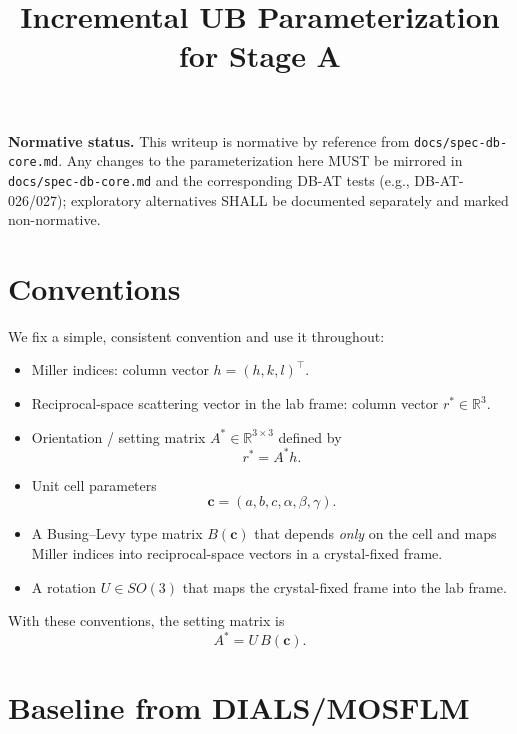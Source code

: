 \documentclass[11pt]{article}
\begin{document}
\title{Incremental UB Parameterization for Stage A}
\author{}
\date{}
\maketitle

\noindent\textbf{Normative status.} This writeup is normative by reference from \texttt{docs/spec-db-core.md}. Any changes to the parameterization here MUST be mirrored in \texttt{docs/spec-db-core.md} and the corresponding DB-AT tests (e.g., DB-AT-026/027); exploratory alternatives SHALL be documented separately and marked non-normative.

\section{Conventions}

We fix a simple, consistent convention and use it throughout:

\begin{itemize}
  \item Miller indices: column vector $h = (h,k,l)^\top$.
  \item Reciprocal-space scattering vector in the lab frame:
        column vector $r^\ast \in \mathbb{R}^3$.
  \item Orientation / setting matrix $A^\ast \in \mathbb{R}^{3\times 3}$ defined by
        \begin{equation}
          r^\ast = A^\ast h.
        \end{equation}
  \item Unit cell parameters
        \begin{equation}
          \mathbf{c} = (a, b, c, \alpha, \beta, \gamma).
        \end{equation}
  \item A Busing--Levy type matrix $B(\mathbf{c})$ that depends \emph{only} on the cell
        and maps Miller indices into reciprocal-space vectors in a crystal-fixed frame.
  \item A rotation $U \in SO(3)$ that maps the crystal-fixed frame into the lab frame.
\end{itemize}

With these conventions, the setting matrix is
\begin{equation}
  A^\ast = U\,B(\mathbf{c}).
\end{equation}

\section{Baseline from DIALS/MOSFLM}
\end{document}
